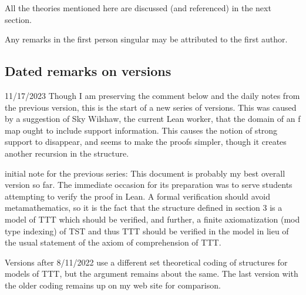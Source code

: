 \documentclass[112pt]{article}
\begin{document}
All the theories mentioned here are discussed (and referenced) in the next section.

Any remarks in the first person singular may be attributed to the first author.

\subsection{Dated remarks on versions}

11/17/2023  Though I am preserving the comment below and the daily notes from the previous version, this is the start of a new series of versions.  This was caused by a suggestion of Sky Wilshaw, the current Lean worker, that the domain of an f map ought to include support information.  This causes the notion of strong support to disappear, and seems to 
make the proofs simpler, though it creates another recursion in the structure.

initial note for the previous series:  This document is probably my best overall version so far.  The immediate occasion for its preparation was to serve students attempting to verify the proof in Lean.  A formal verification should avoid metamathematics, so it is the fact that the structure defined in section 3 is a model of TTT which should be verified, and further, a finite axiomatization (mod type indexing) of TST and thus TTT should be verified in the model in lieu of the usual statement of the axiom of comprehension of TTT.

Versions after 8/11/2022 use a different set theoretical coding of structures for models of TTT, but the argument remains about the same.  The last version with the older coding remains up on my web site for comparison.
\end{document}

